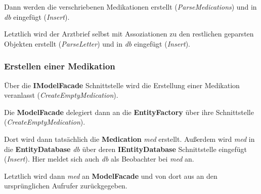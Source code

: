 \documentclass[a4paper]{scrreprt}
\begin{document}
Dann werden die verschriebenen Medikationen erstellt (\textit{ParseMedications}) und in \textit{db} eingefügt (\textit{Insert}). 

Letztlich wird der Arztbrief selbst mit Assoziationen zu den restlichen geparsten Objekten erstellt (\textit{ParseLetter}) und in \textit{db} eingefügt (\textit{Insert}).


\subsubsection{Erstellen einer Medikation}
Über die \textbf{IModelFacade} Schnittstelle wird die Erstellung einer Medikation veranlasst (\textit{CreateEmptyMedication}). 

Die \textbf{ModelFacade} delegiert dann an die \textbf{EntityFactory} über ihre Schnittstelle (\textit{CreateEmptyMedication}).

Dort wird dann tatsächlich die \textbf{Medication} \textit{med} erstellt. Außerdem wird 
\textit{med} in die \textbf{EntityDatabase} \textit{db} über deren \textbf{IEntityDatabase} Schnittstelle eingefügt (\textit{Insert}). Hier meldet sich auch \textit{db} als Beobachter bei \textit{med} an.

Letztlich wird dann \textit{med} an \textbf{ModelFacade} und von dort aus an den ursprünglichen Aufrufer zurückgegeben.
\end{document}
